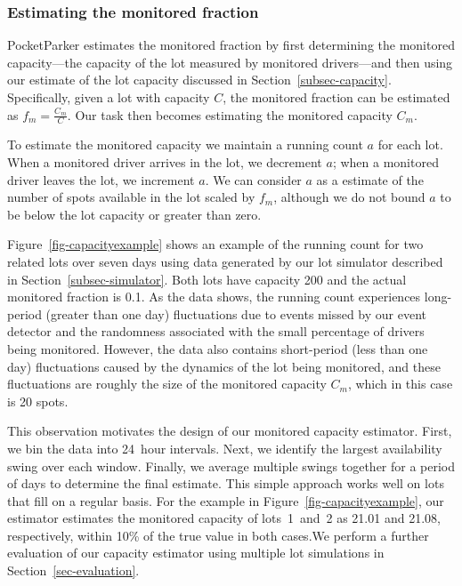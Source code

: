 \subsubsection{Estimating the monitored fraction}
\label{subsubsec-monitored}

PocketParker estimates the monitored fraction by first determining the
monitored capacity---the capacity of the lot measured by monitored
drivers---and then using our estimate of the lot capacity discussed in
Section~\ref{subsec-capacity}. Specifically, given a lot with capacity $C$,
the monitored fraction can be estimated as $f_m = \frac{C_m}{C}$. Our task
then becomes estimating the monitored capacity $C_m$.

To estimate the monitored capacity we maintain a running count $a$ for each
lot. When a monitored driver arrives in the lot, we decrement $a$; when a
monitored driver leaves the lot, we increment $a$. We can consider $a$ as
a estimate of the number of spots available in the lot scaled by $f_m$,
although we do not bound $a$ to be below the lot capacity or greater than
zero.

Figure~\ref{fig-capacityexample} shows an example of the running count for
two related lots over seven days using data generated by our lot simulator
described in Section~\ref{subsec-simulator}. Both lots have capacity 200 and
the actual monitored fraction is 0.1. As the data shows, the running count
experiences long-period (greater than one day) fluctuations due to events
missed by our event detector and the randomness associated with the small
percentage of drivers being monitored. However, the data also contains
short-period (less than one day) fluctuations caused by the dynamics of the
lot being monitored, and these fluctuations are roughly the size of the
monitored capacity $C_m$, which in this case is 20 spots.

This observation motivates the design of our monitored capacity estimator.
First, we bin the data into 24~hour intervals. Next, we identify the largest
availability swing over each window. Finally, we average multiple swings
together for a period of days to determine the final estimate. This simple
approach works well on lots that fill on a regular basis. For the example in
Figure~\ref{fig-capacityexample}, our estimator estimates the monitored
capacity of lots~1~and~2 as 21.01 and 21.08, respectively, within 10\% of the
true value in both cases.We perform a further evaluation of our capacity
estimator using multiple lot simulations in Section~\ref{sec-evaluation}.

